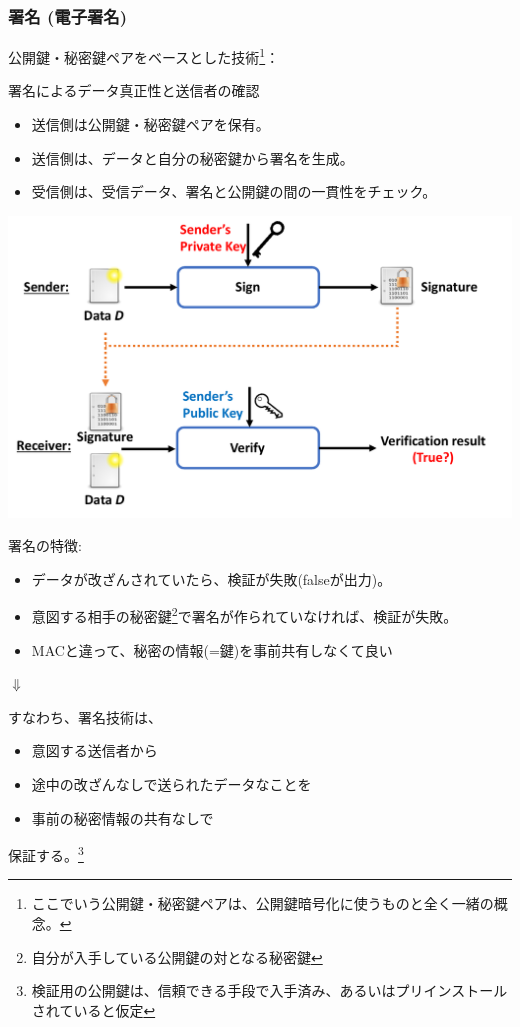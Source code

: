 \documentclass[12pt,dvipdfmx]{beamer}
\begin{document}
\begin{frame}
\frametitle{署名 (電子署名)}
公開鍵・秘密鍵ペアをベースとした技術\footnote[frame]{\scriptsize ここでいう公開鍵・秘密鍵ペアは、公開鍵暗号化に使うものと全く一緒の概念。}：
\begin{block}{署名によるデータ真正性と送信者の確認}
\begin{itemize}
 \item 送信側は公開鍵・秘密鍵ペアを保有。
 \item 送信側は、データと自分の秘密鍵から署名を生成。
 \item 受信側は、受信データ、署名と公開鍵の間の一貫性をチェック。
\end{itemize}
\end{block}
\begin{center}
 \includegraphics[width=0.63\linewidth]{Figs/sig-flow01.pdf}
\end{center}
\end{frame}

\begin{frame}
署名の特徴:
\begin{itemize}
 \item データが改ざんされていたら、検証が失敗(falseが出力)。
 \item 意図する相手の秘密鍵\footnote[frame]{\scriptsize 自分が入手している公開鍵の対となる秘密鍵}で署名が作られていなければ、検証が失敗。
 \item \alert{MACと違って、秘密の情報(=鍵)を事前共有しなくて良い}
\end{itemize}

\begin{center}
 $\Downarrow$
\end{center}
すなわち、署名技術は、\\
\begin{itemize}
 \item 意図する送信者から
 \item 途中の改ざんなしで送られたデータなことを
 \item \alert{事前の秘密情報の共有なし}で
\end{itemize}
保証する。\footnote[frame]{\scriptsize 検証用の公開鍵は、信頼できる手段で入手済み、あるいはプリインストールされていると仮定}
\end{frame}
\end{document}
